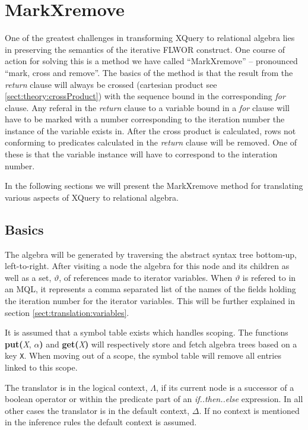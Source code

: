 \section{MarkXremove}
\label{sect:translation:markXremove}

One of the greatest challenges in transforming XQuery to relational algebra
lies in preserving the semantics of the iterative FLWOR construct. One
course of action for solving this is a method we have called ``MarkXremove'' --
pronounced ``mark, cross and remove''. The basics of the method is that the
result from the \textit{return} clause will always be crossed (cartesian product
see \ref{sect:theory:crossProduct}) with the sequence bound in the
corresponding \textit{for} clause. Any referal in the \textit{return} clause to a
variable bound in a \textit{for} clause will have to be marked with a number
corresponding to the iteration number the instance of the variable exists in.
After the cross product is calculated, rows not conforming to predicates
calculated in the \textit{return} clause will be removed. One of these is that
the variable instance will have to correspond to the interation number.

In the following sections we will present the MarkXremove method for
translating various aspects of XQuery to relational algebra.

\subsection{Basics}
The algebra will be generated by traversing the abstract syntax tree bottom-up,
left-to-right. After visiting a node the algebra for this node and its children
as well as a set, $\vartheta$, of references made to iterator variables. When
$\vartheta$ is refered to in an MQL, it represents a comma separated list of
the names of the fields holding the iteration number for the iterator
variables. This will be further explained in section
\ref{sect:translation:variables}.

It is assumed that a symbol table exists which handles scoping. The functions
\textbf{put(}\textit{X}, $\alpha$\textbf{)} and \textbf{get(}\textit{X}\textbf{)}
will respectively store and fetch algebra trees based on a key \verb!X!. When
moving out of a scope, the symbol table will remove all entries linked to this scope.

The translator is in the logical context, $\Lambda$, if its current node is a
successor of a boolean operator or within the predicate part of an
\textit{if..then..else} expression. In all other cases the translator is in the
default context, $\Delta$. If no context is mentioned in the inference rules
the default context is assumed.


